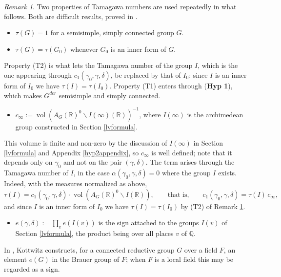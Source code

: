 \documentclass[11pt,a4paper]{article}
\newcommand{\HypOne}{\textbf{Hyp 1}}
\theoremstyle{definition}
\theoremstyle{plain}
\theoremstyle{remark}
\newtheorem{R}[shared]{Remark}
\theoremstyle{plain}
\DeclareMathOperator{\vol}{vol}
\begin{document}
\begin{R}\label{Tamagawa}
    Two properties of Tamagawa numbers are used repeatedly in what follows. Both are difficult results, proved in \cite{MR942522}.
    \begin{itemize}
        \item[(T1)] $\tau(G) = 1$ for a semisimple, simply connected group $G$.
        \item[(T2)] $\tau(G) = \tau(G_0)$ whenever $G_0$ is an inner form of $G$.
    \end{itemize}
    Property (T2) is what lets the Tamagawa number of the group $I$, which is the one appearing through $c_1(\gamma_0,\gamma,\delta)$, be replaced by that of $I_0$: since $I$ is an inner form of $I_0$ we have $\tau(I) = \tau(I_0)$. Property (T1) enters through (\HypOne{}), which makes $G^{der}$ semisimple and simply connected.
\end{R}

\begin{itemize}
    \item $c_{\infty} := \vol(A_G(\mathbb{R})^0 \backslash I(\infty)(\mathbb{R}))^{-1}$, where $I(\infty)$ is the archimedean group constructed in Section \ref{lvformula}.
\end{itemize}

This volume is finite and non-zero by the discussion of $I(\infty)$ in Section \ref{lvformula} and Appendix \ref{hyp2appendix}, so $c_{\infty}$ is well defined; note that it depends only on $\gamma_0$ and not on the pair $(\gamma, \delta)$. The term arises through the Tamagawa number of $I$, in the case $\alpha(\gamma_0, \gamma, \delta) = 0$ where the group $I$ exists. Indeed, with the measures normalized as above,
$$\tau (I) = c_1(\gamma_0, \gamma, \delta) \cdot \vol (A_G(\mathbb{R})^0 \backslash I(\mathbb{R})), \qquad \text{that is,} \qquad c_1(\gamma_0, \gamma, \delta) = \tau(I) \, c_{\infty},$$
and since $I$ is an inner form of $I_0$ we have $\tau(I) = \tau(I_0)$ by (T2) of Remark \ref{Tamagawa}.

\begin{itemize}
    \item $e(\gamma,\delta) := \prod_v e(I(v))$ is the sign attached to the groups $I(v)$ of Section \ref{lvformula}, the product being over all places $v$ of $\mathbb{Q}$.
\end{itemize}

In \cite{MR697075}, Kottwitz constructs, for a connected reductive group $G$ over a field $F$, an element $e(G)$ in the Brauer group of $F$; when $F$ is a local field this may be regarded as a sign.
\end{document}
